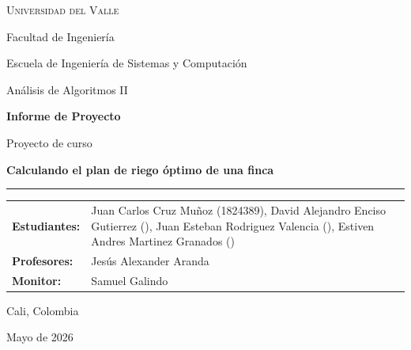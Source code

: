 \documentclass[12pt,a4paper]{article}
\begin{document}
\hypersetup{pageanchor=false}
\begin{titlepage}
  \thispagestyle{empty}
  \begingroup
  \setlength{\parskip}{0pt}
  \centering
  \vspace*{0.5cm}

  {\large\scshape Universidad del Valle\par}
  \vspace{0.12cm}
  {\normalsize Facultad de Ingenier\'ia\par}
  \vspace{0.12cm}
  {\normalsize Escuela de Ingenier\'ia de Sistemas y Computaci\'on\par}
  \vspace{0.12cm}
  {\normalsize An\'alisis de Algoritmos II\par}

  \vspace{1.4cm}

  {\Large\bfseries Informe de Proyecto\par}
  \vspace{0.35cm}
  {\normalsize Proyecto de curso\par}
  \vspace{0.45cm}
  {\LARGE\bfseries Calculando el plan de riego \'optimo de una finca\par}
  \vspace{0.5cm}
  \rule{0.78\textwidth}{0.9pt}\par

  \vspace{1.2cm}

  \begin{minipage}{0.82\textwidth}
    \centering
    \renewcommand{\arraystretch}{1.25}
    \begin{tabular}{>{\bfseries}p{4cm}p{8.2cm}}
      Estudiantes: & Juan Carlos Cruz Mu\~noz (1824389), David Alejandro Enciso Gutierrez (), Juan Esteban Rodriguez Valencia (), Estiven Andres Martinez Granados () \\
      Profesores: & Jes\'us Alexander Aranda \\
      Monitor: & Samuel Galindo \\
    \end{tabular}
  \end{minipage}

  \vfill

  {\normalsize Cali, Colombia\par}
  \vspace{0.15cm}
  {\normalsize Mayo de 2026\par}
  \endgroup
\end{titlepage}
\end{document}
